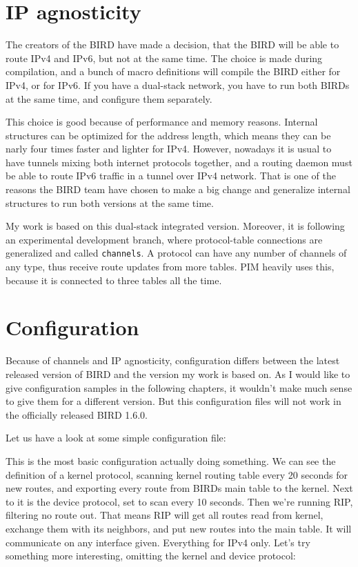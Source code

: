 \section{IP agnosticity}
The creators of the BIRD have made a decision, that the BIRD will be able to
route IPv4 and IPv6, but not at the same time. The choice is made during
compilation, and a bunch of macro definitions will compile the BIRD either for
IPv4, or for IPv6. If you have a dual-stack network, you have to run both BIRDs
at the same time, and configure them separately.

This choice is good because of performance and memory reasons. Internal
structures can be optimized for the address length, which means they can be
narly four times faster and lighter for IPv4. However, nowadays it is usual to
have tunnels mixing both internet protocols together, and a routing daemon must
be able to route IPv6 traffic in a tunnel over IPv4 network. That is one of the
reasons the BIRD team have chosen to make a big change and generalize internal
structures to run both versions at the same time.

My work is based on this dual-stack integrated version. Moreover, it is
following an experimental development branch, where protocol-table connections
are generalized and called \texttt{channels}. A protocol can have any number of
channels of any type, thus receive route updates from more tables. PIM heavily
uses this, because it is connected to three tables all the time.

\section{Configuration}
Because of channels and IP agnosticity, configuration differs between the
latest released version of BIRD and the version my work is based on. As I would
like to give configuration samples in the following chapters, it wouldn't make
much sense to give them for a different version. But this configuration files
will not work in the officially released BIRD 1.6.0.

Let us have a look at some simple configuration file:


This is the most basic configuration actually doing something. We can see the
definition of a kernel protocol, scanning kernel routing table every 20 seconds
for new routes, and exporting every route from BIRDs main table to the kernel.
Next to it is the device protocol, set to scan every 10 seconds. Then we're
running RIP, filtering no route out. That means RIP will get all routes read
from kernel, exchange them with its neighbors, and put new routes into the main
table. It will communicate on any interface given. Everything for IPv4 only.
Let's try something more interesting, omitting the kernel and device protocol:


